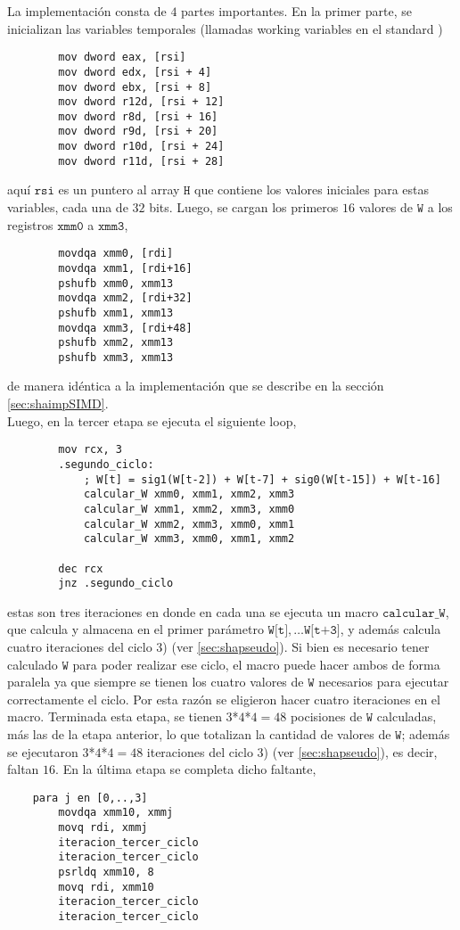 La implementación consta de $4$ partes importantes. En la primer parte, se inicializan las variables temporales (llamadas working variables en el standard \cite{Fips})
\begin{verbatim}
        mov dword eax, [rsi]
        mov dword edx, [rsi + 4]
        mov dword ebx, [rsi + 8]
        mov dword r12d, [rsi + 12]
        mov dword r8d, [rsi + 16]
        mov dword r9d, [rsi + 20]
        mov dword r10d, [rsi + 24]
        mov dword r11d, [rsi + 28]
\end{verbatim}
aquí $\texttt{rsi}$ es un puntero al array $\texttt{H}$ que contiene los valores iniciales para estas variables, cada una de $32$ bits.
Luego, se cargan los primeros $16$ valores de $\texttt{W}$ a los registros $\texttt{xmm0}$ a $\texttt{xmm3}$, 
\begin{verbatim}
        movdqa xmm0, [rdi]
        movdqa xmm1, [rdi+16]
        pshufb xmm0, xmm13
        movdqa xmm2, [rdi+32]
        pshufb xmm1, xmm13
        movdqa xmm3, [rdi+48]
        pshufb xmm2, xmm13
        pshufb xmm3, xmm13
\end{verbatim}
de manera idéntica a la implementación que se describe en la sección \ref{sec:shaimpSIMD}. \\
Luego, en la tercer etapa se ejecuta el siguiente loop,
\begin{verbatim}
        mov rcx, 3
        .segundo_ciclo:
            ; W[t] = sig1(W[t-2]) + W[t-7] + sig0(W[t-15]) + W[t-16]
            calcular_W xmm0, xmm1, xmm2, xmm3
            calcular_W xmm1, xmm2, xmm3, xmm0
            calcular_W xmm2, xmm3, xmm0, xmm1			
            calcular_W xmm3, xmm0, xmm1, xmm2
		
        dec rcx
        jnz .segundo_ciclo
\end{verbatim}
estas son tres iteraciones en donde en cada una se ejecuta un macro $\texttt{calcular\_W}$, que calcula y almacena en el primer parámetro $\texttt{W[t]}, \dots \texttt{W[t+3]}$, y además calcula cuatro iteraciones del ciclo 3) (ver \ref{sec:shapseudo}). Si bien es necesario tener calculado $\texttt{W}$ para poder realizar ese ciclo, el macro puede hacer ambos de forma paralela ya que siempre se tienen los cuatro valores de $\texttt{W}$ necesarios para ejecutar correctamente el ciclo. Por esta razón se eligieron hacer cuatro iteraciones en el macro. Terminada esta etapa, se tienen $3$*$4$*$4 = 48$ pocisiones de $\texttt{W}$ calculadas, más las de la etapa anterior, lo que totalizan la cantidad de valores de $\texttt{W}$; además se ejecutaron $3$*$4$*$4 = 48$ iteraciones del ciclo 3) (ver \ref{sec:shapseudo}), es decir, faltan $16$. En la última etapa se completa dicho faltante,
\begin{verbatim}
    para j en [0,..,3]
        movdqa xmm10, xmmj
        movq rdi, xmmj
        iteracion_tercer_ciclo
        iteracion_tercer_ciclo
        psrldq xmm10, 8
        movq rdi, xmm10
        iteracion_tercer_ciclo
        iteracion_tercer_ciclo		
\end{verbatim}


